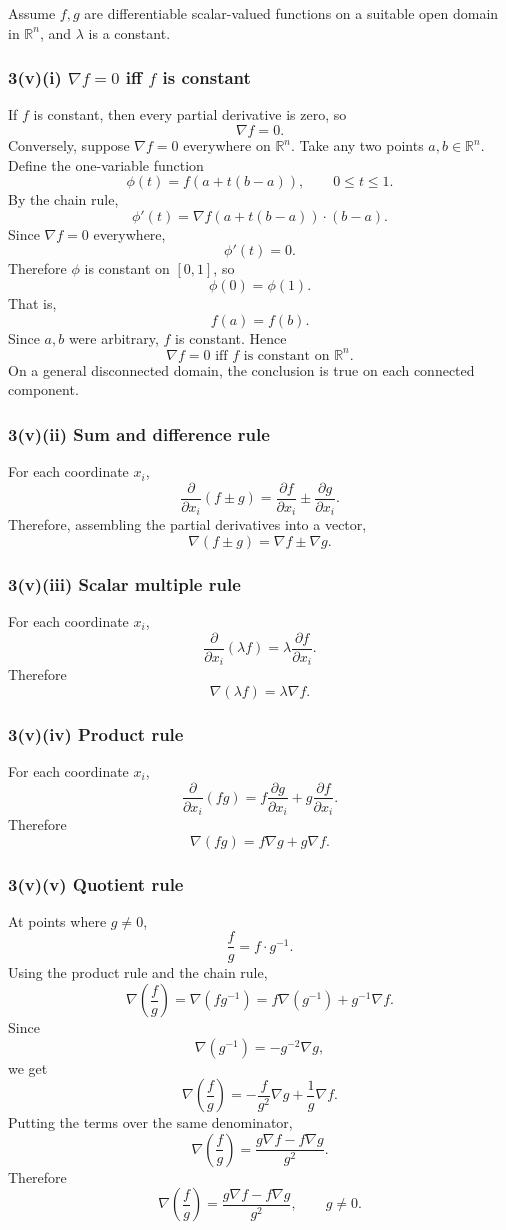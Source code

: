 \documentclass[11pt]{article}
\newcommand{\R}{\mathbb{R}}
\newcommand{\grad}{\nabla}
\begin{document}
Assume $f,g$ are differentiable scalar-valued functions on a suitable open domain in $\R^n$, and $\lambda$ is a constant.

\subsubsection*{3(v)(i) $\grad f=0$ iff $f$ is constant}
If $f$ is constant, then every partial derivative is zero, so
\[
 \grad f=0.
\]
Conversely, suppose $\grad f=0$ everywhere on $\R^n$.  Take any two points $a,b\in\R^n$.  Define the one-variable function
\[
 \phi(t)=f(a+t(b-a)),\qquad 0\leq t\leq 1.
\]
By the chain rule,
\[
 \phi'(t)=\grad f(a+t(b-a))\cdot(b-a).
\]
Since $\grad f=0$ everywhere,
\[
 \phi'(t)=0.
\]
Therefore $\phi$ is constant on $[0,1]$, so
\[
 \phi(0)=\phi(1).
\]
That is,
\[
 f(a)=f(b).
\]
Since $a,b$ were arbitrary, $f$ is constant. Hence
\[
 \boxed{\grad f=0\text{ iff }f\text{ is constant on }\R^n.}
\]
On a general disconnected domain, the conclusion is true on each connected component.

\subsubsection*{3(v)(ii) Sum and difference rule}
For each coordinate $x_i$,
\[
 \frac{\partial}{\partial x_i}(f\pm g)
 =\frac{\partial f}{\partial x_i}\pm\frac{\partial g}{\partial x_i}.
\]
Therefore, assembling the partial derivatives into a vector,
\[
 \boxed{\grad(f\pm g)=\grad f\pm\grad g.}
\]

\subsubsection*{3(v)(iii) Scalar multiple rule}
For each coordinate $x_i$,
\[
 \frac{\partial}{\partial x_i}(\lambda f)
 =\lambda\frac{\partial f}{\partial x_i}.
\]
Therefore
\[
 \boxed{\grad(\lambda f)=\lambda\grad f.}
\]

\subsubsection*{3(v)(iv) Product rule}
For each coordinate $x_i$,
\[
 \frac{\partial}{\partial x_i}(fg)
 =f\frac{\partial g}{\partial x_i}+g\frac{\partial f}{\partial x_i}.
\]
Therefore
\[
 \boxed{\grad(fg)=f\grad g+g\grad f.}
\]

\subsubsection*{3(v)(v) Quotient rule}
At points where $g\neq 0$,
\[
 \frac{f}{g}=f\cdot g^{-1}.
\]
Using the product rule and the chain rule,
\[
 \grad\left(\frac{f}{g}\right)
 =\grad(fg^{-1})
 =f\grad(g^{-1})+g^{-1}\grad f.
\]
Since
\[
 \grad(g^{-1})=-g^{-2}\grad g,
\]
we get
\[
 \grad\left(\frac{f}{g}\right)
 =-\frac{f}{g^2}\grad g+\frac1g\grad f.
\]
Putting the terms over the same denominator,
\[
 \grad\left(\frac{f}{g}\right)
 =\frac{g\grad f-f\grad g}{g^2}.
\]
Therefore
\[
 \boxed{\grad\left(\frac{f}{g}\right)=\frac{g\grad f-f\grad g}{g^2},\qquad g\neq 0.}
\]
\end{document}
